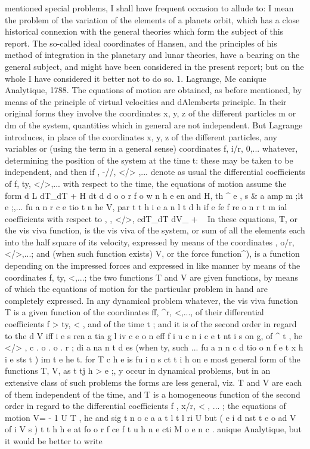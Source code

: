 \documentclass[11pt,a4paper]{book}
\begin{document}
mentioned special problems, I shall have frequent occasion to allude to: I mean the
problem of the variation of the elements of a planets orbit, which has a close historical
connexion with the general theories which form the subject of this report. The so-called
ideal coordinates of Hansen, and the principles of his method of integration in the
planetary and lunar theories, have a bearing on the general subject, and might have
been considered in the present report; but on the whole I have considered it better
not to do so.
1. Lagrange, Me canique Analytique, 1788. The equations of motion are obtained,
as before mentioned, by means of the principle of virtual velocities and dAlemberts
principle. In their original forms they involve the coordinates x, y, z of the different
particles m or dm of the system, quantities which in general are not independent.
But Lagrange introduces, in place of the coordinates x, y, z of the different particles,
any variables or (using the term in a general sense) coordinates f, i/r, 0,... whatever,
determining the position of the system at the time t: these may be taken to be
independent, and then if , -//, </> ,... denote as usual the differential coefficients of
f, ty, </>,... with respect to the time, the equations of motion assume the form
d L dT_dT + H
dt d d
o o r f o w n h e en and H, th ^ e , s & a amp m ;lt e ;,... fu a n r c e tio t n he V, par t t h i e a n l t d h if e fe f re o n r t m ial coefficients with respect to , \jr, </>,
cdT_dT dV_
+ ~
In these equations, T, or the vis viva function, is the vis viva of the system, or sum
of all the elements each into the half square of its velocity, expressed by means of
the coordinates , o/r, </>,...; and (when such function exists) V, or the force function^),
is a function depending on the impressed forces and expressed in like manner by
means of the coordinates f, ty, <,...; the two functions T and V are given functions,
by means of which the equations of motion for the particular problem in hand are
completely expressed. In any dynamical problem whatever, the vis viva function T is
a given function of the coordinates ff, ^r, <,..., of their differential coefficients
f > ty, < , and of the time t ; and it is of the second order in regard to the
d V iff i e s ren a tia g l iv c e o n eff f i u c n i c e t nt i s on g, of ^ t , he </> , c . o . o . r ; di a na n t d es (when ty, such ... fu a n n c d tio o n f e t x h i e sts t ) im t e he t. for T c h e is fu i n s ct t i h on e
most general form of the functions T, V, as t tj h > e ;, y occur in dynamical problems, but
in an extensive class of such problems the forms are less general, viz. T and V are
each of them independent of the time, and T is a homogeneous function of the second
order in regard to the differential coefficients f , x/r, < , ... ; the equations of motion
V= - 1 U T , he and sig t n o c a a t l t l ri U but ( e i d nst t e o ad V of i V s ) t t h h e at fo o r f ce f t u h n e cti M o e n c . anique Analytique, but it would be better to write
\end{document}

